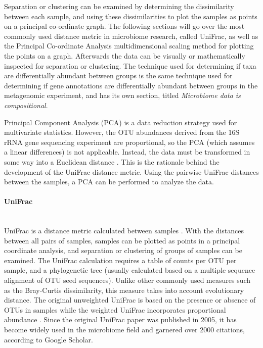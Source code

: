 Separation or clustering can be examined by determining the dissimilarity between each sample, and using these dissimilarities to plot the samples as points on a principal co-ordinate graph. The following sections will go over the most commonly used distance metric in microbiome research, called UniFrac, as well as the Principal Co-ordinate Analysis multidimensional scaling method for plotting the points on a graph. Afterwards the data can be visually or mathematically inspected for separation or clustering. The technique used for determining if taxa are differentially abundant between groups is the same technique used for determining if gene annotations are differentially abundant between groups in the metagenomic experiment, and has its own section, titled \textit{Microbiome data is compositional}.

Principal Component Analysis (PCA) is a data reduction strategy used for multivariate statistics. However, the OTU abundances derived from the 16S rRNA gene sequencing experiment are proportional, so the PCA (which assumes a linear differences) is not applicable. Instead, the data must be transformed in some way into a Euclidean distance \cite{anderson2003canonical}. This is the rationale behind the development of the UniFrac distance metric. Using the pairwise UniFrac distances between the samples, a PCA can be performed to analyze the data.

\paragraph{UniFrac}\mbox{}\\
UniFrac is a distance metric calculated between samples \cite{lozupone2005unifrac}. With the distances between all pairs of samples, samples can be plotted as points in a principal coordinate analysis, and separation or clustering of groups of samples can be examined. The UniFrac calculation requires a table of counts per OTU per sample, and a phylogenetic tree (usually calculated based on a multiple sequence alignment of OTU seed sequences). Unlike other commonly used measures such as the Bray-Curtis dissimilarity, this measure takes into account evolutionary distance. The original unweighted UniFrac is based on the presence or absence of OTUs in samples \cite{lozupone2005unifrac} while the weighted UniFrac incorporates proportional abundance \cite{lozupone2007quantitative}. Since the original UniFrac paper was published in 2005, it has become widely used in the microbiome field and garnered over 2000 citations, according to Google Scholar.


